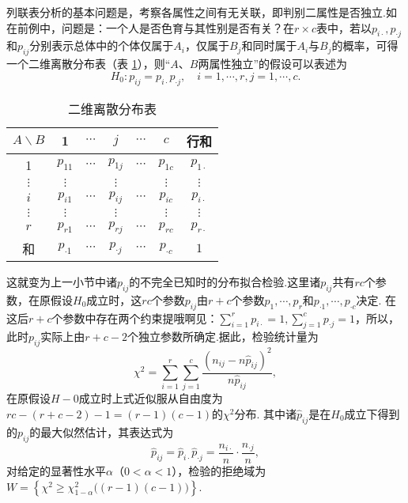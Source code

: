 列联表分析的基本问题是，考察各属性之间有无关联，即判别二属性是否独立.如在前例中，问题是：一个人是否色育与其性别是否有关？在$r\times c$表中，若以$p_{i\cdot},p_{\cdot j}$和$p_{ij}$分别表示总体中的个体仅属于$A_i$，仅属于$B_j$和同时属于$A_i$与$B_j$的概率，可得一个二维离散分布表（表 \ref{tab7.4.4}），则“$A$、$B$两属性独立”的假设可以表述为
\[
  H_0: p_{ij} = p_{i\cdot}p_{\cdot j},\quad i = 1,\cdots,r,j = 1,\cdots,c.
\]
\begin{table}[!ht]
  \centering
  \caption{二维离散分布表}\label{tab7.4.4}
  \begin{tabular}{c|*{5}{c}|c}
    \toprule
    $A\backslash B$ & 1 & $\cdots$ & $j$ & $\cdots$ & $c$ & 行和 \\
    \midrule
    1 & $p_{11}$ & $\cdots$ & $p_{1j}$ & $\cdots$ & $p_{1c}$ & $p_{1\cdot}$  \\
    $\vdots$ & $\vdots$ & & $\vdots$ & & $\vdots$ & $\vdots$ \\
    $i$ & $p_{i1}$ & $\cdots$ & $p_{ij}$ & $\cdots$ & $p_{ic}$ & $p_{i\cdot}$ \\
    $\vdots$ & $\vdots$ & & $\vdots$ & & $\vdots$ & $\vdots$ \\
    $r$ & $p_{r1}$ & $\cdots$ & $p_{rj}$ & $\cdots$ & $p_{rc}$ & $p_{r\cdot}$ \\
    \midrule
    和 & $p_{\cdot1}$ & $\cdots$ & $p_{\cdot j}$ & $\cdots$ & $p_{\cdot c}$ & $1$ \\
    \bottomrule
  \end{tabular}
\end{table}

这就变为上一小节中诸$p_{ij}$的不完全已知时的分布拟合检验.这里诸$p_{ij}$共有$rc$个参数，在原假设$H_0$成立时，这$rc$个参数$p_{ij}$由$r+c$个参数$p_1,\cdots,p_r$和$p_{\cdot1},\cdots,p_{\cdot c}$决定. 在这后$r+c$个参数中存在两个约束提哦啊见：$\sum_{i=1}^rp_{i\cdot}=1,\sum_{j=1}^cp_{\cdot j}=1$，所以，此时$p_{ij}$实际上由$r+c-2$个独立参数所确定.据此，检验统计量为
\[
  \chi^2 = \sum_{i=1}^r\sum_{j=1}^c\frac{(n_{ij}-n\hat p_{ij})^2}{n\hat p_{ij}},
\]
在原假设$H-0$成立时上式近似服从自由度为$rc-(r+c-2)-1=(r-1)(c-1)$的$\chi^2$分布. 其中诸$\hat p_{ij}$是在$H_0$成立下得到的$p_{ij}$的最大似然估计，其表达式为
\[
  \hat p_{ij} = \hat p_{i\cdot} \hat p_{\cdot j} = \frac{n_{i\cdot}}n\cdot \frac{n_{\cdot j}}n,
\]
对给定的显著性水平$\alpha$（$0<\alpha<1$），检验的拒绝域为$W=\left\{ \chi^2\ge\chi_{1-\alpha}^2\big((r-1)(c-1)\big) \right\}$.

